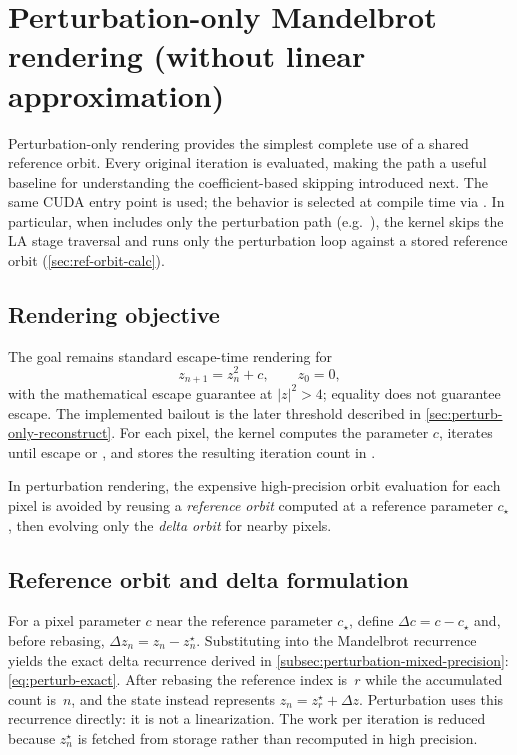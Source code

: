 \section[Perturbation-only Mandelbrot rendering]{Perturbation-only Mandelbrot rendering (without linear approximation)}
\label{sec:perturb-only}

Perturbation-only rendering provides the simplest complete use of a shared
reference orbit. Every original iteration is evaluated, making the path a useful
baseline for understanding the coefficient-based skipping introduced next.
The same CUDA entry point
 is
used; the behavior is selected at compile time via . In
particular, when  includes only the perturbation path (e.g.\
), the kernel skips the LA stage traversal and runs only the
perturbation loop against a stored reference orbit (\cref{sec:ref-orbit-calc}).

\subsection{Rendering objective}
\label{sec:perturb-only-goal}

The goal remains standard escape-time rendering for
\[
z_{n+1} = z_n^2 + c,\qquad z_0=0,
\]
with the mathematical escape guarantee at $|z|^2>4$; equality does not guarantee
escape. The implemented bailout is the later threshold described in
\cref{sec:perturb-only-reconstruct}. For each pixel, the kernel computes the parameter
\(c\), iterates until escape or \code{n\_iterations}, and stores the resulting
iteration count in \code{OutputIterMatrix[idx]}.

In perturbation rendering, the expensive high-precision orbit evaluation for
each pixel is avoided by reusing a \emph{reference orbit} computed at a
reference parameter \(c_\star\), then evolving only the \emph{delta orbit} for
nearby pixels.

\subsection{Reference orbit and delta formulation}
\label{sec:perturb-only-deltas}

For a pixel parameter \(c\) near the reference parameter \(c_\star\), define
\(\Delta c = c - c_\star\) and, before rebasing,
\(\Delta z_n = z_n - z_n^\star\).
Substituting into the Mandelbrot recurrence yields the exact delta recurrence
derived in \cref{subsec:perturbation-mixed-precision}:
\eqref{eq:perturb-exact}. After rebasing the reference index is~$r$ while the
accumulated count is~$n$, and the state instead represents
$z_n=z_r^\star+\Delta z$.
Perturbation uses this recurrence directly: it is not a linearization. The work
per iteration is reduced because \(z_n^\star\) is fetched from storage rather
than recomputed in high precision.

